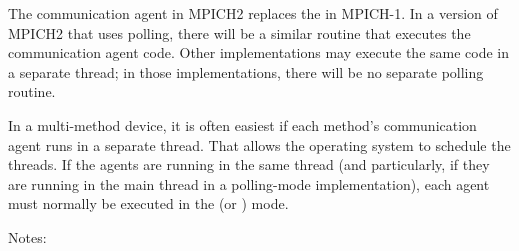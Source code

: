 \ifcodefirst
\else
{}
\fi

The communication agent in MPICH2 replaces the  in
MPICH-1.  In a version of MPICH2 that uses polling, there will be a similar
routine that executes the communication agent code.  Other implementations may
execute the same code in a separate thread; in those implementations, there
will be no separate polling routine.

In a multi-method device, it is often easiest if each method's communication 
agent runs in a separate thread.  That allows the operating system to 
schedule the threads.  If the agents are running in the same thread (and 
particularly, if they are running in the main thread in a polling-mode 
implementation), each agent must normally be executed in the
 (or ) mode.

\ifcodefirst
{}
\fi

Notes:

